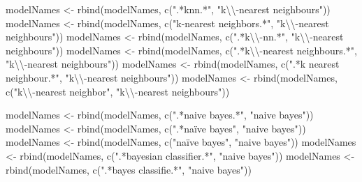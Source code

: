 \documentclass[
]{article}
\newenvironment{Shaded}{\begin{snugshade}}{\end{snugshade}}
\newcommand{\FunctionTok}[1]{\textcolor[rgb]{0.00,0.00,0.00}{#1}}
\newcommand{\NormalTok}[1]{#1}
\newcommand{\OtherTok}[1]{\textcolor[rgb]{0.56,0.35,0.01}{#1}}
\newcommand{\SpecialCharTok}[1]{\textcolor[rgb]{0.00,0.00,0.00}{#1}}
\newcommand{\StringTok}[1]{\textcolor[rgb]{0.31,0.60,0.02}{#1}}
\begin{document}
\begin{Shaded}
\begin{Highlighting}[]
\NormalTok{modelNames }\OtherTok{\textless{}{-}} \FunctionTok{rbind}\NormalTok{(modelNames, }\FunctionTok{c}\NormalTok{(}\StringTok{".*knn.*"}\NormalTok{, }\StringTok{"k}\SpecialCharTok{\textbackslash{}\textbackslash{}}\StringTok{{-}nearest neighbours"}\NormalTok{))}
\NormalTok{modelNames }\OtherTok{\textless{}{-}} \FunctionTok{rbind}\NormalTok{(modelNames, }\FunctionTok{c}\NormalTok{(}\StringTok{"k{-}nearest neighbors.*"}\NormalTok{, }\StringTok{"k}\SpecialCharTok{\textbackslash{}\textbackslash{}}\StringTok{{-}nearest neighbours"}\NormalTok{))}
\NormalTok{modelNames }\OtherTok{\textless{}{-}} \FunctionTok{rbind}\NormalTok{(modelNames, }\FunctionTok{c}\NormalTok{(}\StringTok{".*k}\SpecialCharTok{\textbackslash{}\textbackslash{}}\StringTok{{-}nn.*"}\NormalTok{, }\StringTok{"k}\SpecialCharTok{\textbackslash{}\textbackslash{}}\StringTok{{-}nearest neighbours"}\NormalTok{))}
\NormalTok{modelNames }\OtherTok{\textless{}{-}} \FunctionTok{rbind}\NormalTok{(modelNames, }\FunctionTok{c}\NormalTok{(}\StringTok{".*k}\SpecialCharTok{\textbackslash{}\textbackslash{}}\StringTok{{-}nearest neighbours.*"}\NormalTok{, }\StringTok{"k}\SpecialCharTok{\textbackslash{}\textbackslash{}}\StringTok{{-}nearest neighbours"}\NormalTok{))}
\NormalTok{modelNames }\OtherTok{\textless{}{-}} \FunctionTok{rbind}\NormalTok{(modelNames, }\FunctionTok{c}\NormalTok{(}\StringTok{".*k nearest neighbour.*"}\NormalTok{, }\StringTok{"k}\SpecialCharTok{\textbackslash{}\textbackslash{}}\StringTok{{-}nearest neighbours"}\NormalTok{))}
\NormalTok{modelNames }\OtherTok{\textless{}{-}} \FunctionTok{rbind}\NormalTok{(modelNames, }\FunctionTok{c}\NormalTok{(}\StringTok{"k}\SpecialCharTok{\textbackslash{}\textbackslash{}}\StringTok{{-}nearest neighbor"}\NormalTok{, }\StringTok{"k}\SpecialCharTok{\textbackslash{}\textbackslash{}}\StringTok{{-}nearest neighbours"}\NormalTok{))}

\NormalTok{modelNames }\OtherTok{\textless{}{-}} \FunctionTok{rbind}\NormalTok{(modelNames, }\FunctionTok{c}\NormalTok{(}\StringTok{".*naive bayes.*"}\NormalTok{, }\StringTok{"naive bayes"}\NormalTok{))}
\NormalTok{modelNames }\OtherTok{\textless{}{-}} \FunctionTok{rbind}\NormalTok{(modelNames, }\FunctionTok{c}\NormalTok{(}\StringTok{".*naïve bayes"}\NormalTok{, }\StringTok{"naive bayes"}\NormalTok{))}
\NormalTok{modelNames }\OtherTok{\textless{}{-}} \FunctionTok{rbind}\NormalTok{(modelNames, }\FunctionTok{c}\NormalTok{(}\StringTok{"naïve bayes"}\NormalTok{, }\StringTok{"naive bayes"}\NormalTok{))}
\NormalTok{modelNames }\OtherTok{\textless{}{-}} \FunctionTok{rbind}\NormalTok{(modelNames, }\FunctionTok{c}\NormalTok{(}\StringTok{".*bayesian classifier.*"}\NormalTok{, }\StringTok{"naive bayes"}\NormalTok{))}
\NormalTok{modelNames }\OtherTok{\textless{}{-}} \FunctionTok{rbind}\NormalTok{(modelNames, }\FunctionTok{c}\NormalTok{(}\StringTok{".*bayes classifie.*"}\NormalTok{, }\StringTok{"naive bayes"}\NormalTok{))}


\end{Highlighting}
\end{Shaded}
\end{document}
